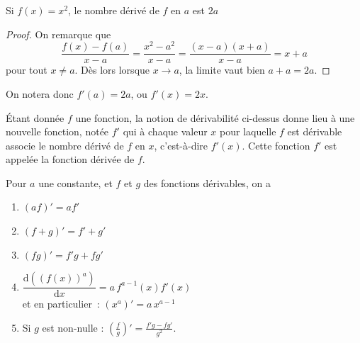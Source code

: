 \begin{frame}
  
\end{frame}
\begin{frame}
\begin{example}
  Si \(f(x) = x^{2}\), le nombre dérivé de \(f\) en \(a\) est \(2a\)
\end{example}
\begin{proof}
  On remarque que
  \begin{equation*}
\frac{f(x)-f(a)}{x-a} = \frac{x^{2}-a^{2}}{x-a} = \frac{(x-a)(x+a)}{x-a} = x+a
\end{equation*}
pour tout \(x \neq a\). Dès lors lorsque \(x \to a\), la limite vaut bien \(a + a = 2a\).
\end{proof}

On notera donc \(f'(a) = 2a\), ou \(f'(x) = 2x\).
\end{frame}
\begin{frame}
  Étant donnée \(f\) une fonction, la notion de dérivabilité ci-dessus donne lieu à une nouvelle fonction, notée \(f'\) qui à chaque valeur \(x\)  pour laquelle \(f\) est dérivable associe le nombre dérivé de \(f\) en \(x\), c'est-à-dire \(f'(x)\). Cette fonction \(f'\) est appelée la fonction dérivée de \(f\).
\end{frame}
\begin{frame}%
  \begin{proposition}Pour $a$ une constante, et $f$ et $g$ des fonctions dérivables, on a
    \begin{enumerate}
    \item $(af)' = a f'$
    \item $(f + g)' = f' + g'$
    \item $(f g)' = f' g + f g'$
    \item $\dfrac{\mathrm{d} ((f(x))^a)}{\mathrm{d} x} = a \, f^{a-1}(x)
      f'(x)$ \\
      et en particulier~: $\left( x^a \right)' = a \, x^{a-1}$
    \item Si $g$ est non-nulle : $\left(\frac{f}{g}\right)' = \frac{f'g - fg'}{g^2}$.
    \end{enumerate}
  \end{proposition}
\end{frame}

